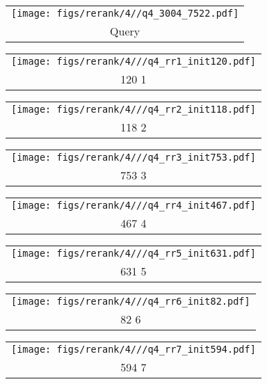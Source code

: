 \begin{figure*}[t]
\begin{tabular}{@{\sssp}c@{\sssp}}\texttt{[image: figs/rerank/4//q4\_3004\_7522.pdf]}\\Query\\ \end{tabular} 
\begin{tabular}{@{\sssp}c@{\sssp}}\texttt{[image: figs/rerank/4///q4\_rr1\_init120.pdf]}\\120  1\\ \end{tabular} 
\begin{tabular}{@{\sssp}c@{\sssp}}\texttt{[image: figs/rerank/4///q4\_rr2\_init118.pdf]}\\118  2\\ \end{tabular} 
\begin{tabular}{@{\sssp}c@{\sssp}}\texttt{[image: figs/rerank/4///q4\_rr3\_init753.pdf]}\\753  3\\ \end{tabular} 
\begin{tabular}{@{\sssp}c@{\sssp}}\texttt{[image: figs/rerank/4///q4\_rr4\_init467.pdf]}\\467  4\\ \end{tabular} 
\begin{tabular}{@{\sssp}c@{\sssp}}\texttt{[image: figs/rerank/4///q4\_rr5\_init631.pdf]}\\631  5\\ \end{tabular} 
\begin{tabular}{@{\sssp}c@{\sssp}}\texttt{[image: figs/rerank/4///q4\_rr6\_init82.pdf]}\\82  6\\ \end{tabular} 
\begin{tabular}{@{\sssp}c@{\sssp}}\texttt{[image: figs/rerank/4///q4\_rr7\_init594.pdf]}\\594  7\\ \end{tabular} 

  \vspace{2ex}


\end{figure*}
